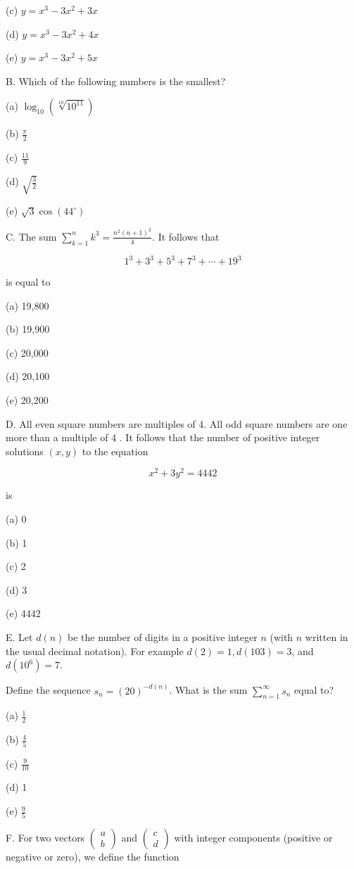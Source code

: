 \documentclass[10pt]{article}
\begin{document}
(c) $y=x^{3}-3 x^{2}+3 x$

(d) $y=x^{3}-3 x^{2}+4 x$

(e) $y=x^{3}-3 x^{2}+5 x$

B. Which of the following numbers is the smallest?

(a) $\log _{10}\left(\sqrt[10]{10^{11}}\right)$

(b) $\frac{\pi}{2}$

(c) $\frac{11}{9}$

(d) $\sqrt{\frac{3}{2}}$

(e) $\sqrt{3} \cos \left(44^{\circ}\right)$

C. The sum $\sum_{k=1}^{n} k^{3}=\frac{n^{2}(n+1)^{2}}{4}$. It follows that

$$
1^{3}+3^{3}+5^{3}+7^{3}+\cdots+19^{3}
$$

is equal to

(a) 19,800

(b) 19,900

(c) 20,000

(d) 20,100

(e) 20,200

D. All even square numbers are multiples of 4. All odd square numbers are one more than a multiple of 4 . It follows that the number of positive integer solutions $(x, y)$ to the equation

$$
x^{2}+3 y^{2}=4442
$$

is

(a) 0

(b) 1

(c) 2

(d) 3

(e) 4442

E. Let $d(n)$ be the number of digits in a positive integer $n$ (with $n$ written in the usual decimal notation). For example $d(2)=1, d(103)=3$, and $d\left(10^{6}\right)=7$.

Define the sequence $s_{n}=(20)^{-d(n)}$. What is the sum $\sum_{n=1}^{\infty} s_{n}$ equal to?

(a) $\frac{1}{2}$

(b) $\frac{4}{5}$

(c) $\frac{9}{10}$

(d) 1

(e) $\frac{9}{5}$

F. For two vectors $\left(\begin{array}{l}a \\ b\end{array}\right)$ and $\left(\begin{array}{l}c \\ d\end{array}\right)$ with integer components (positive or negative or zero), we define the function
\end{document}
